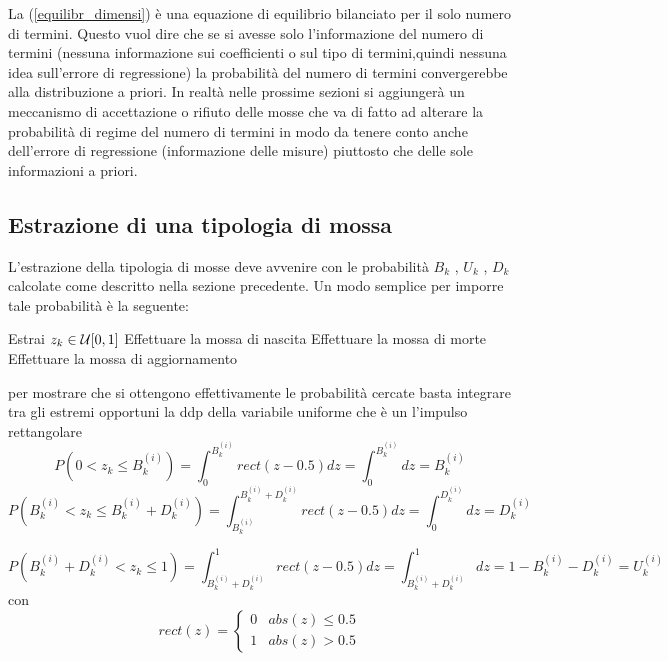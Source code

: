 La (\ref{equilibr_dimensi}) è una equazione di equilibrio bilanciato per il solo numero di termini.
Questo vuol dire che se si avesse solo l’informazione del numero di termini (nessuna
informazione sui coefficienti o sul tipo di termini,quindi nessuna idea sull’errore di
regressione) la probabilità del numero di termini convergerebbe alla distribuzione a
priori. In realtà nelle prossime sezioni si aggiungerà un meccanismo di accettazione
o rifiuto delle mosse che va di fatto ad alterare la probabilità di regime del numero
di termini in modo da tenere conto anche dell’errore di regressione (informazione
delle misure) piuttosto che delle sole informazioni a priori.
\subsection{Estrazione di una tipologia di mossa}
L’estrazione della tipologia di mosse deve avvenire con le probabilità $B_k$ , $U_k$ , $D_k$
calcolate come descritto nella sezione precedente. Un modo semplice per imporre
tale probabilità è la seguente:\\

\begin{algorithmic}
\State Estrai $z_k\in\mathcal{U}[0,1]$
\State Effettuare la mossa di nascita
\State Effettuare la mossa di morte
\Else
\State Effettuare la mossa di aggiornamento
\EndIf
\end{algorithmic}
per mostrare che si ottengono effettivamente le probabilità cercate basta integrare
tra gli estremi opportuni la ddp della variabile uniforme che è un l’impulso
rettangolare
\begin{equation}
P\left(0<z_k\leq B_k^{(i)}\right)=\int_0^{B_k^{(i)}}rect(z-0.5)dz=\int_0^{B_k^{(i)}}dz={B_k^{(i)}}
\end{equation}
\begin{equation}
P\left(B_k^{(i)}<z_k\leq B_k^{(i)}+D_k^{(i)}\right)=\int_{B_k^{(i)}}^{B_k^{(i)}+D_k^{(i)}}rect(z-0.5)dz=\int_0^{D_k^{(i)}}dz={D_k^{(i)}}
\end{equation}

\begin{equation}
P\left(B_k^{(i)}+D_k^{(i)}<z_k\leq 1 \right)=\int_{B_k^{(i)}+D_k^{(i)}}^{1}rect(z-0.5)dz=\int_{B_k^{(i)}+D_k^{(i)}}^{1}dz=1-{B_k^{(i)}}-{D_k^{(i)}}=U_k^{(i)}
\end{equation}
con
\begin{equation}
rect(z)=\begin{cases}
0 & abs(z)\leq 0.5\\
1 & abs(z)>0.5 
\end{cases}
\end{equation}

